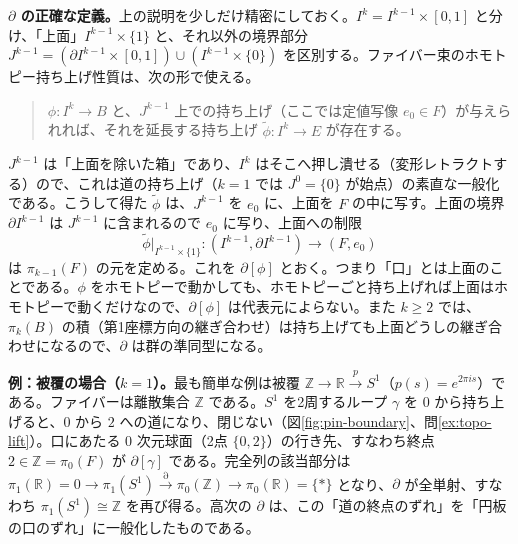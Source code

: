 \documentclass[uplatex, dvipdfmx, book]{jsbook}
\begin{document}
\textbf{$\partial$ の正確な定義。}上の説明を少しだけ精密にしておく。$I^k = I^{k-1} \times [0,1]$ と分け、「上面」$I^{k-1} \times \{1\}$ と、それ以外の境界部分 $J^{k-1} = (\partial I^{k-1} \times [0,1]) \cup (I^{k-1} \times \{0\})$ を区別する。ファイバー束のホモトピー持ち上げ性質は、次の形で使える。
\begin{quote}
    $\phi: I^k \to B$ と、$J^{k-1}$ 上での持ち上げ（ここでは定値写像 $e_0 \in F$）が与えられれば、それを延長する持ち上げ $\tilde{\phi}: I^k \to E$ が存在する。
\end{quote}
$J^{k-1}$ は「上面を除いた箱」であり、$I^k$ はそこへ押し潰せる（変形レトラクトする）ので、これは道の持ち上げ（$k = 1$ では $J^0 = \{0\}$ が始点）の素直な一般化である。こうして得た $\tilde{\phi}$ は、$J^{k-1}$ を $e_0$ に、上面を $F$ の中に写す。上面の境界 $\partial I^{k-1}$ は $J^{k-1}$ に含まれるので $e_0$ に写り、上面への制限
\begin{equation*}
    \tilde{\phi}|_{I^{k-1} \times \{1\}}: (I^{k-1}, \partial I^{k-1}) \to (F, e_0)
\end{equation*}
は $\pi_{k-1}(F)$ の元を定める。これを $\partial[\phi]$ とおく。つまり「口」とは上面のことである。$\phi$ をホモトピーで動かしても、ホモトピーごと持ち上げれば上面はホモトピーで動くだけなので、$\partial[\phi]$ は代表元によらない。また $k \ge 2$ では、$\pi_k(B)$ の積（第1座標方向の継ぎ合わせ）は持ち上げても上面どうしの継ぎ合わせになるので、$\partial$ は群の準同型になる。

\textbf{例：被覆の場合（$k = 1$）。}最も簡単な例は被覆 $\mathbb{Z} \to \mathbb{R} \xrightarrow{p} S^1$（$p(s) = e^{2\pi i s}$）である。ファイバーは離散集合 $\mathbb{Z}$ である。$S^1$ を2周するループ $\gamma$ を $0$ から持ち上げると、$0$ から $2$ への道になり、閉じない（図\ref{fig:pin-boundary}、問\ref{ex:topo-lift}）。口にあたる $0$ 次元球面（2点 $\{0, 2\}$）の行き先、すなわち終点 $2 \in \mathbb{Z} = \pi_0(F)$ が $\partial[\gamma]$ である。完全列の該当部分は $\pi_1(\mathbb{R}) = 0 \to \pi_1(S^1) \xrightarrow{\partial} \pi_0(\mathbb{Z}) \to \pi_0(\mathbb{R}) = \{*\}$ となり、$\partial$ が全単射、すなわち $\pi_1(S^1) \cong \mathbb{Z}$ を再び得る。高次の $\partial$ は、この「道の終点のずれ」を「円板の口のずれ」に一般化したものである。
\end{document}
